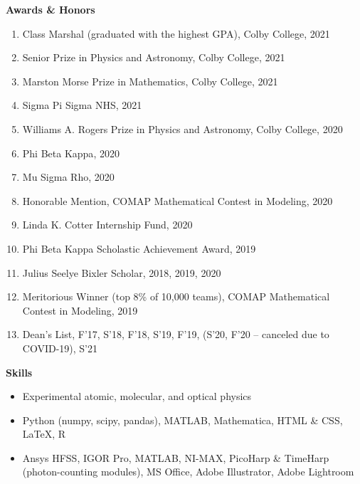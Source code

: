 \documentclass[10pt]{article}
\begin{document}
\noindent \large{\textbf{{Awards \& Honors }}}  \normalsize 

\begin{enumerate}
	\setlength\itemsep{-4pt}
	\item Class Marshal (graduated with the highest GPA), Colby College, {2021}
	\item Senior Prize in Physics and Astronomy, Colby College, {2021}
	\item Marston Morse Prize in Mathematics, Colby College, {2021}
	\item Sigma Pi Sigma NHS, {2021}
	\item {Williams A. Rogers Prize in Physics and Astronomy}, Colby College, {2020} 
	\item {Phi Beta Kappa}, {2020} 
	\item {Mu Sigma Rho}, {2020}
	\item {Honorable Mention,}  COMAP Mathematical Contest in Modeling, {2020}
	\item {Linda K. Cotter Internship Fund}, {2020}
	\item {Phi Beta Kappa Scholastic Achievement Award,} {2019}
	\item {Julius Seelye Bixler Scholar,} {2018, 2019, 2020}
	\item {Meritorious Winner (top 8\% of 10,000 teams),}  COMAP Mathematical Contest in Modeling, {2019}
	\item {Dean’s List}, {F'17, S'18, F'18, S'19, F'19, (S'20, F'20 -- canceled due to COVID-19), S'21}
\end{enumerate}



\noindent \large{\textbf{{Skills}}} \normalsize

\begin{itemize}
\setlength\itemsep{-4pt}
\item Experimental atomic, molecular, and optical physics
\item {} Python (numpy, scipy, pandas), MATLAB, Mathematica, HTML \& CSS, \LaTeX{}, R
\item {} Ansys HFSS, IGOR Pro, MATLAB, NI-MAX, PicoHarp \& TimeHarp (photon-counting modules), MS Office,  Adobe Illustrator, Adobe Lightroom
\end{itemize}
\end{document}
